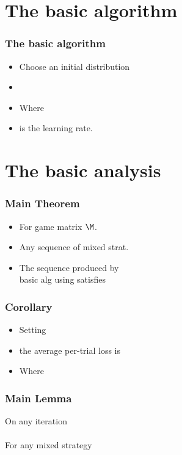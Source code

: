 \documentclass[handout]{beamer}
\begin{document}
\section{The basic algorithm}

\begin{frame}
\frametitle{The basic algorithm}
\begin{itemize}
\item Choose an initial distribution 
\item {}
\item Where 
\item {} is the learning rate.
\end{itemize}
\end{frame}

\section{The basic analysis}

\begin{frame}
\frametitle{Main Theorem}
\begin{itemize}
\item For  game matrix $\M$.
\item Any sequence of mixed strat. 
\item The sequence  produced by \\
basic alg using  satisfies
\end{itemize}
\end{frame}

\begin{frame}
\frametitle{Corollary}
\begin{itemize}
\item Setting 
\item the average per-trial loss is
\item Where 
\R{\[
\delt = \sqrt{2 \ln n \over T} + {\ln n \over T} 
= O\paren{\sqrt{\frac{\ln n}{T}}}.
\]}
\end{itemize}
\end{frame}

\begin{frame}
\frametitle{Main Lemma}

On any iteration 
\\ ~ \\ \pause
For any mixed strategy \R{$\Pref$}
\\ ~ \\ \pause
{}
\end{frame}
\end{document}
